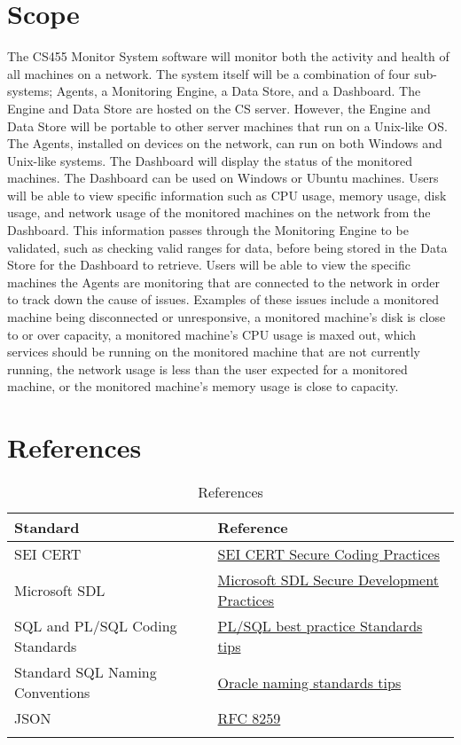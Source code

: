 \documentclass[letterpaper,12pt,oneside,listof=totoc]{scrreprt}
\begin{document}
\section{Scope}

The CS455 Monitor System software will monitor both the activity and health of all machines on a network. The system itself will be a combination of four sub-systems; Agents, a Monitoring Engine, a Data Store, and a Dashboard. The Engine and Data Store are hosted on the CS server. However, the Engine and Data Store will be portable to other server machines that run on a Unix-like OS. The Agents, installed on devices on the network, can run on both Windows and Unix-like systems. The Dashboard will display the status of the monitored machines. The Dashboard can be used on Windows or Ubuntu machines. Users will be able to view specific information such as CPU usage, memory usage, disk usage, and network usage of the monitored machines on the network from the Dashboard. This information passes through the Monitoring Engine to be validated, such as checking valid ranges for data, before being stored in the Data Store for the Dashboard to retrieve. Users will be able to view the specific machines the Agents are monitoring that are connected to the network in order to track down the cause of issues. Examples of these issues include a monitored machine being disconnected or unresponsive, a monitored machine's disk is close to or over capacity, a monitored machine's CPU usage is maxed out, which services should be running on the monitored machine that are not currently running, the network usage is less than the user expected for a monitored machine, or the monitored machine's memory usage is close to capacity. 




\section{References}
\begin{longtable}{ p{} p{} } 
   \textbf{ Standard} & \textbf{Reference }\\
    \hline
    SEI CERT & \href{https://wiki.sei.cmu.edu/confluence/display/seccode}{SEI CERT Secure Coding Practices}\\
    \hline
    Microsoft SDL & \href{https://www.microsoft.com/en-us/securityengineering/sdl/practices}{Microsoft SDL Secure Development Practices}\\
    \hline   
    SQL and PL/SQL Coding Standards  & \href{http://www.dba-oracle.com/t_plsql_best_practices_standards.htm}{PL/SQL best practice Standards tips}\\
    \hline
    Standard SQL Naming Conventions & \href{http://www.dba-oracle.com/standards_schema_object_names.htm}{Oracle naming standards tips}\\
    \hline
    JSON &  \href{https://datatracker.ietf.org/doc/html/rfc8259}{RFC 8259}\\
    \hline    
\caption{References}
\end{longtable}
\end{document}
